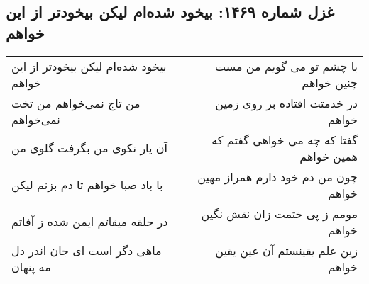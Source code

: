 \begin{center}
\section*{غزل شماره ۱۴۶۹: بیخود شده‌ام لیکن بیخودتر از این خواهم}
\label{sec:1469}
\begin{longtable}{l p{0.5cm} r}
بیخود شده‌ام لیکن بیخودتر از این خواهم
&&
با چشم تو می گویم من مست چنین خواهم
\\
من تاج نمی‌خواهم من تخت نمی‌خواهم
&&
در خدمتت افتاده بر روی زمین خواهم
\\
آن یار نکوی من بگرفت گلوی من
&&
گفتا که چه می خواهی گفتم که همین خواهم
\\
با باد صبا خواهم تا دم بزنم لیکن
&&
چون من دم خود دارم همراز مهین خواهم
\\
در حلقه میقاتم ایمن شده ز آفاتم
&&
مومم ز پی ختمت زان نقش نگین خواهم
\\
ماهی دگر است ای جان اندر دل مه پنهان
&&
زین علم یقینستم آن عین یقین خواهم
\\
\end{longtable}
\end{center}
